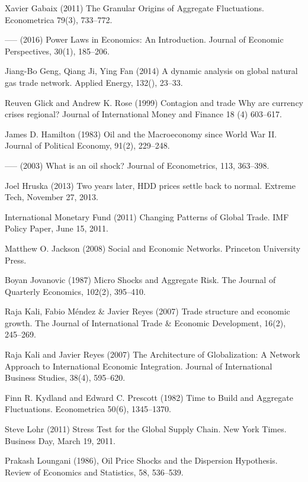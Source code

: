 \documentclass[10pt,letterpaper,pdftex]{article}
\begin{document}
\begin{thebibliography}{99}
Xavier Gabaix (2011) The Granular Origins of Aggregate Fluctuations. Econometrica 79(3), 733--772.

----- (2016) Power Laws in Economics: An Introduction. Journal of Economic Perspectives, 30(1), 185--206.

Jiang-Bo Geng, Qiang Ji, Ying Fan (2014) A dynamic analysis on global natural gas trade network. Applied Energy, 132(), 23--33.

Reuven Glick and Andrew K. Rose (1999) Contagion and trade Why are currency crises regional? Journal of International Money and Finance 18 (4) 603--617.

James D. Hamilton (1983) Oil and the Macroeconomy since World War II. Journal of Political Economy, 91(2), 229--248.

----- (2003) What is an oil shock? Journal of Econometrics, 113, 363--398.

Joel Hruska (2013) Two years later, HDD prices settle back to normal. Extreme Tech, November 27, 2013. 

International Monetary Fund (2011) Changing Patterns of Global Trade. IMF Policy Paper, June 15, 2011.

Matthew O. Jackson (2008) Social and Economic Networks. Princeton University Press.

Boyan Jovanovic (1987) Micro Shocks and Aggregate Risk. The Journal of Quarterly Economics, 102(2), 395--410.

Raja Kali, Fabio M\'endez \& Javier Reyes (2007) Trade structure and economic growth. The Journal of International Trade \& Economic Development, 16(2), 245--269.

Raja Kali and Javier Reyes (2007) The Architecture of Globalization: A Network Approach to International Economic Integration. Journal of International Business Studies, 38(4), 595--620.

Finn R. Kydland and Edward C. Prescott (1982) Time to Build and Aggregate Fluctuations. Econometrica 50(6), 1345--1370.

Steve Lohr (2011) Stress Test for the Global Supply Chain. New York Times. Business Day, March 19, 2011. 

Prakash Loungani (1986), Oil Price Shocks and the Dispersion Hypothesis. Review of Economics and Statistics, 58, 536--539.


\end{thebibliography}
\end{document}

